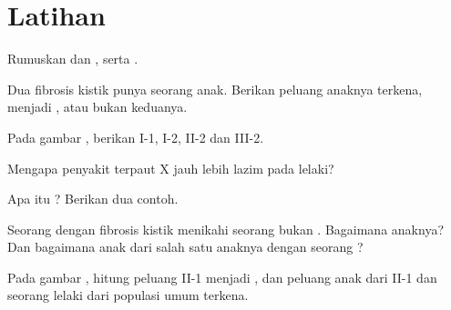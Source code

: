 \section{Latihan}

\begin{exercise}[$\star$]\label{exo:g11:genes-and-disease:1}
Rumuskan   dan  , serta .
\end{exercise}

\begin{exercise}[$\star$]\label{exo:g11:genes-and-disease:2}
Dua  fibrosis kistik punya seorang anak. Berikan peluang anaknya
terkena, menjadi , atau bukan keduanya.
\end{exercise}

\begin{exercise}[$\star$]\label{exo:g11:genes-and-disease:3}
Pada gambar , berikan  I-1, I-2, II-2 dan
III-2.
\end{exercise}

\begin{exercise}[$\star$]\label{exo:g11:genes-and-disease:4}
Mengapa penyakit  terpaut X jauh lebih lazim pada lelaki?
\end{exercise}

\begin{exercise}[$\star$]\label{exo:g11:genes-and-disease:5}
Apa itu ? Berikan dua contoh.
\end{exercise}

\begin{exercise}[$\star\star$]\label{exo:g11:genes-and-disease:6}
Seorang dengan fibrosis kistik menikahi seorang bukan .
Bagaimana anaknya? Dan bagaimana anak dari salah satu anaknya dengan
seorang ?
\end{exercise}

\begin{exercise}[$\star\star$]\label{exo:g11:genes-and-disease:7}
Pada gambar , hitung peluang II-1 menjadi , dan
peluang anak dari II-1 dan seorang lelaki dari populasi umum terkena.
\end{exercise}

